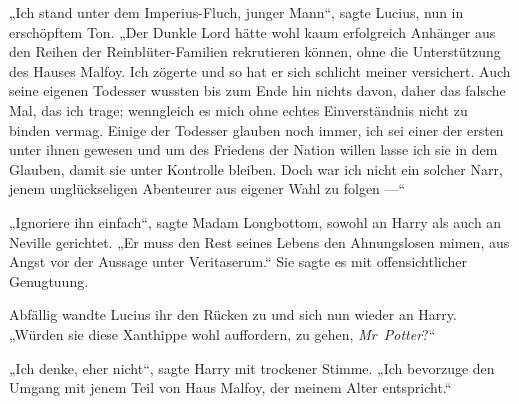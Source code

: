 „Ich stand unter dem Imperius-Fluch, junger Mann“, sagte Lucius, nun in erschöpftem Ton.
„Der Dunkle Lord hätte wohl kaum erfolgreich Anhänger aus den Reihen der Reinblüter-Familien rekrutieren können, ohne die Unterstützung des Hauses Malfoy. Ich zögerte und so hat er sich schlicht meiner versichert. Auch seine eigenen Todesser wussten bis zum Ende hin nichts davon, daher das falsche Mal, das ich trage; wenngleich es mich ohne echtes Einverständnis nicht zu binden vermag. Einige der Todesser glauben noch immer, ich sei einer der ersten unter ihnen gewesen und um des Friedens der Nation willen lasse ich sie in dem Glauben, damit sie unter Kontrolle bleiben. Doch war ich nicht ein solcher Narr, jenem unglückseligen Abenteurer aus eigener Wahl zu folgen —“

„Ignoriere ihn einfach“, sagte Madam Longbottom, sowohl an Harry als auch an Neville gerichtet.
„Er muss den Rest seines Lebens den Ahnungslosen mimen, aus Angst vor der Aussage unter Veritaserum.“ Sie sagte es mit offensichtlicher Genugtuung.

Abfällig wandte Lucius ihr den Rücken zu und sich nun wieder an Harry.
„Würden sie diese Xanthippe wohl auffordern, zu gehen, \emph{Mr~Potter}?“%

„Ich denke, eher nicht“, sagte Harry mit trockener Stimme.
„Ich bevorzuge den Umgang mit jenem Teil von Haus Malfoy, der meinem Alter entspricht.“

